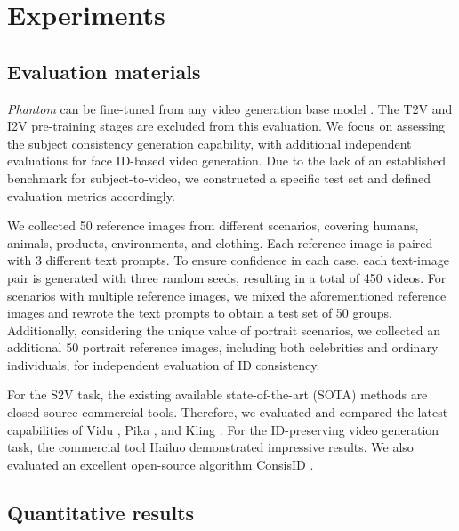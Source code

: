 \section{Experiments}
\label{sec:exps}

\subsection{Evaluation materials}
\label{sec:exp:eval_mat}

\textit{Phantom} can be fine-tuned from any video generation base model \cite{lin2025diffusion, wang2025seedvr}. The T2V and I2V pre-training stages are excluded from this evaluation. We focus on assessing the subject consistency generation capability, with additional independent evaluations for face ID-based video generation. Due to the lack of an established benchmark for subject-to-video, we constructed a specific test set and defined evaluation metrics accordingly.

We collected 50 reference images from different scenarios, covering humans, animals, products, environments, and clothing. Each reference image is paired with 3 different text prompts. To ensure confidence in each case, each text-image pair is generated with three random seeds, resulting in a total of 450 videos. For scenarios with multiple reference images, we mixed the aforementioned reference images and rewrote the text prompts to obtain a test set of 50 groups. Additionally, considering the unique value of portrait scenarios, we collected an additional 50 portrait reference images, including both celebrities and ordinary individuals, for independent evaluation of ID consistency. 

For the S2V task, the existing available state-of-the-art (SOTA) methods are closed-source commercial tools. Therefore, we evaluated and compared the latest capabilities of Vidu \cite{Vidu}, Pika \cite{Pika}, and Kling \cite{Keling}. For the ID-preserving video generation task, the commercial tool Hailuo \cite{Hailuo} demonstrated impressive results. We also evaluated an excellent open-source algorithm ConsisID \cite{yuan2024identity}.

\subsection{Quantitative results}
\label{sec:exp:quant}

